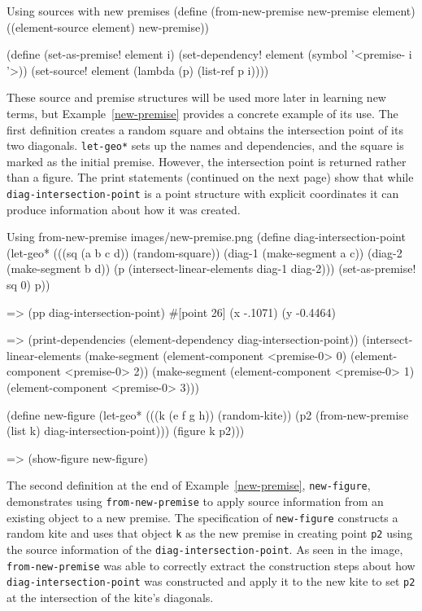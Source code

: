 \begin{code-example}
[label=new-premises]
{Using sources with new premises}
(define (from-new-premise new-premise element)
  ((element-source element) new-premise))

(define (set-as-premise! element i)
  (set-dependency! element (symbol '<premise- i '>))
  (set-source! element (lambda (p) (list-ref p i))))
\end{code-example}

These source and premise structures will be used more later in
learning new terms, but Example~\ref{new-premise} provides a concrete
example of its use. The first definition creates a random square and
obtains the intersection point of its two diagonals. \texttt{let-geo*}
sets up the names and dependencies, and the square is marked as the
initial premise. However, the intersection point is returned rather
than a figure.  The print statements (continued on the next page) show
that while \texttt{diag-intersection-point} is a point structure with
explicit coordinates it can produce information about how it was
created.

\begin{img-example}
[label=new-premise, breakable]
{Using from-new-premise}
{images/new-premise.png}
(define diag-intersection-point
  (let-geo*
      (((sq (a b c d)) (random-square))
       (diag-1 (make-segment a c))
       (diag-2 (make-segment b d))
       (p (intersect-linear-elements diag-1 diag-2)))
    (set-as-premise! sq 0)
    p))

=> (pp diag-intersection-point)
#[point 26] (x -.1071) (y -0.4464)

=> (print-dependencies (element-dependency diag-intersection-point))
(intersect-linear-elements
 (make-segment (element-component <premise-0> 0)
               (element-component <premise-0> 2))
 (make-segment (element-component <premise-0> 1)
               (element-component <premise-0> 3)))

(define new-figure
  (let-geo* (((k (e f g h)) (random-kite))
             (p2 (from-new-premise (list k) diag-intersection-point)))
    (figure k p2)))

=> (show-figure new-figure)
\end{img-example}

The second definition at the end of Example~\ref{new-premise},
\texttt{new-figure}, demonstrates using \texttt{from-new-premise} to
apply source information from an existing object to a new premise.
The specification of \texttt{new-figure} constructs a random kite and
uses that object \texttt{k} as the new premise in creating point
\texttt{p2} using the source information of the
\texttt{diag-intersection-point}. As seen in the image,
\texttt{from-new-premise} was able to correctly extract the
construction steps about how \texttt{diag-intersection-point} was
constructed and apply it to the new kite to set \texttt{p2} at the
intersection of the kite's diagonals.

